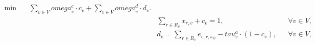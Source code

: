 \begin{align}
  \min\quad & \sum_{v \in V} \mathit{omega}_{v}^{c} \cdot c_{v} + \sum_{v \in V} \mathit{omega}_{v}^{d} \cdot d_{v} . \tag{eq\_0001} \\
  &  & \sum_{r \in R_{v}} x_{r , v} + c_{v} = 1 , & & \forall v \in V , &  \tag{eq\_0011} \\
  &  & d_{v} = \sum_{r \in R_{v}} e_{v , r , s_{D}} - \mathit{tau}_{v}^{a} \cdot \left(1 - c_{v}\right) , & & \forall v \in V , & &  \tag{eq\_0015} \\
\end{align}
